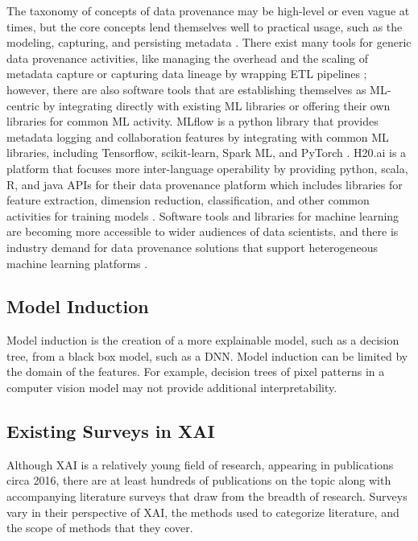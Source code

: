 The taxonomy of concepts of data provenance may be high-level or even vague at times, but the core concepts lend themselves well to practical usage, such as the modeling, capturing, and persisting metadata \cite{Simmhan:2005:SDP:1084805.1084812}.  There exist many tools for generic data provenance activities, like managing the overhead and the scaling of metadata capture \cite{Simmhan2005ASO} or capturing data lineage by wrapping ETL pipelines \cite{Interlandi2017}; however, there are also software tools that are establishing themselves as ML-centric by integrating directly with existing ML libraries or offering their own libraries for common ML activity.  MLflow is a python library that provides metadata logging and collaboration features by integrating with common ML libraries, including Tensorflow, scikit-learn, Spark ML, and PyTorch \cite{Zaharia2018}.  H20.ai is a platform that focuses more inter-language operability by providing python, scala, R, and java APIs for their data provenance platform which includes libraries for feature extraction, dimension reduction, classification, and other common activities for training models \cite{H20.ai}.  Software tools and libraries for machine learning are becoming more accessible to wider audiences of data scientists, and there is industry demand for data provenance solutions that support heterogeneous machine learning platforms \cite{Schelter2017}.

\subsection{Model Induction}

Model induction is the creation of a more explainable model, such as a decision tree, from a black box model, such as a DNN.  Model induction can be limited by the domain of the features.  For example, decision trees of pixel patterns in a computer vision model may not provide additional interpretability.

\subsection{Existing Surveys in XAI}

Although XAI is a relatively young field of research, appearing in publications circa 2016, there are at least hundreds of publications on the topic along with accompanying literature surveys that draw from the breadth of research.  Surveys vary in their perspective of XAI, the methods used to categorize literature, and the scope of methods that they cover.

